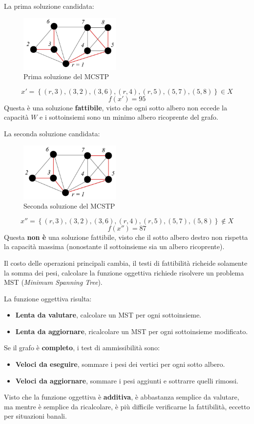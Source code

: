 \documentclass{article}
\begin{document}
La prima soluzione candidata:

\begin{figure}[H]
    \centering
    \includegraphics[width=5cm]{images/MCSTP_fst_sol.png}
    \caption{Prima soluzione del MCSTP}
    \label{fig:fst_sol_MCSTP}
\end{figure}

$$x'=\left\{(r,3),(3,2),(3,6),(r,4),(r,5),(5,7),(5,8)\right\}\in X$$
$$f(x')=95$$
Questa è una soluzione \textbf{fattibile}, visto che ogni sotto albero non eccede la
capacità $W$ e i sottoinsiemi sono un minimo albero ricoprente del grafo.

La seconda soluzione candidata:

\begin{figure}[H]
    \centering
    \includegraphics[width=5cm]{images/MCSTP_snd_sol.png}
    \caption{Seconda soluzione del MCSTP}
    \label{fig:snd_sol_MCSTP}
\end{figure}

$$x''=\left\{(r,3),(3,2),(3,6),(r,4),(r,5),(5,7),(5,8)\right\}\notin X$$
$$f(x'')=87$$
Questa \textbf{non è} una soluzione fattibile, visto che il sotto albero destro non rispetta
la capacità massima (nonostante il sottoinsieme sia un albero ricoprente).

Il costo delle operazioni principali cambia, il testi di fattibilità richeide solamente la somma
dei pesi, calcolare la funzione oggettiva richiede risolvere un problema
MST (\textit{Minimum Spanning Tree}).

La funzione oggettiva risulta:
\begin{itemize}
    \item \textbf{Lenta da valutare}, calcolare un MST per ogni sottoinsieme.
    \item \textbf{Lenta da aggiornare}, ricalcolare un MST per ogni sottoinsieme modificato.
\end{itemize}
Se il grafo è \textbf{completo}, i test di ammissibilità sono:
\begin{itemize}
    \item \textbf{Veloci da eseguire}, sommare i pesi dei vertici per ogni sotto albero.
    \item \textbf{Veloci da aggiornare}, sommare i pesi aggiunti e sottrarre quelli rimossi.
\end{itemize}
Visto che la funzione oggettiva è \textbf{additiva}, è abbastanza semplice da valutare, ma mentre
è semplice da ricalcolare, è più difficile verificarne la fattibilità, eccetto per situazioni banali.
\end{document}
